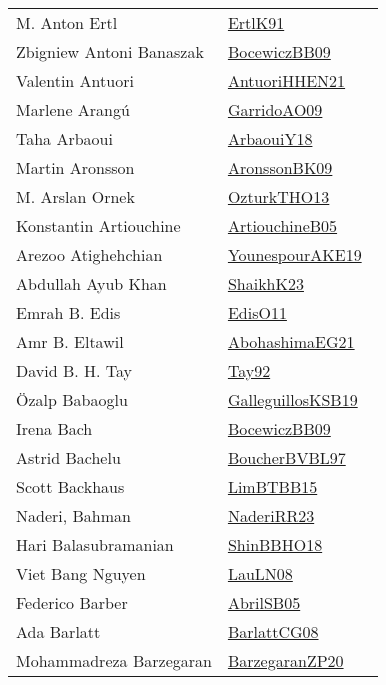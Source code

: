 {\begin{longtable}{p{4cm}p{20cm}}
M. Anton Ertl & \href{papers/ErtlK91.pdf}{ErtlK91}~\cite{ErtlK91}\\
Zbigniew Antoni Banaszak & \href{}{BocewiczBB09}~\cite{BocewiczBB09}\\
Valentin Antuori & \href{papers/AntuoriHHEN21.pdf}{AntuoriHHEN21}~\cite{AntuoriHHEN21}\\
Marlene Arang{\'{u}} & \href{articles/GarridoAO09.pdf}{GarridoAO09}~\cite{GarridoAO09}\\
Taha Arbaoui & \href{papers/ArbaouiY18.pdf}{ArbaouiY18}~\cite{ArbaouiY18}\\
Martin Aronsson & \href{papers/AronssonBK09.pdf}{AronssonBK09}~\cite{AronssonBK09}\\
M. Arslan Ornek & \href{articles/OzturkTHO13.pdf}{OzturkTHO13}~\cite{OzturkTHO13}\\
Konstantin Artiouchine & \href{papers/ArtiouchineB05.pdf}{ArtiouchineB05}~\cite{ArtiouchineB05}\\
Arezoo Atighehchian & \href{}{YounespourAKE19}~\cite{YounespourAKE19}\\
Abdullah Ayub Khan & \href{}{ShaikhK23}~\cite{ShaikhK23}\\
Emrah B. Edis & \href{papers/EdisO11.pdf}{EdisO11}~\cite{EdisO11}\\
Amr B. Eltawil & \href{articles/AbohashimaEG21.pdf}{AbohashimaEG21}~\cite{AbohashimaEG21}\\
David B. H. Tay & \href{}{Tay92}~\cite{Tay92}\\
{\"{O}}zalp Babaoglu & \href{papers/GalleguillosKSB19.pdf}{GalleguillosKSB19}~\cite{GalleguillosKSB19}\\
Irena Bach & \href{}{BocewiczBB09}~\cite{BocewiczBB09}\\
Astrid Bachelu & \href{}{BoucherBVBL97}~\cite{BoucherBVBL97}\\
Scott Backhaus & \href{papers/LimBTBB15.pdf}{LimBTBB15}~\cite{LimBTBB15}\\
Naderi, Bahman & \href{articles/NaderiRR23.pdf}{NaderiRR23}~\cite{NaderiRR23}\\
Hari Balasubramanian & \href{articles/ShinBBHO18.pdf}{ShinBBHO18}~\cite{ShinBBHO18}\\
Viet Bang Nguyen & \href{papers/LauLN08.pdf}{LauLN08}~\cite{LauLN08}\\
Federico Barber & \href{papers/AbrilSB05.pdf}{AbrilSB05}~\cite{AbrilSB05}\\
Ada Barlatt & \href{papers/BarlattCG08.pdf}{BarlattCG08}~\cite{BarlattCG08}\\
Mohammadreza Barzegaran & \href{papers/BarzegaranZP20.pdf}{BarzegaranZP20}~\cite{BarzegaranZP20}\\

\end{longtable}}
